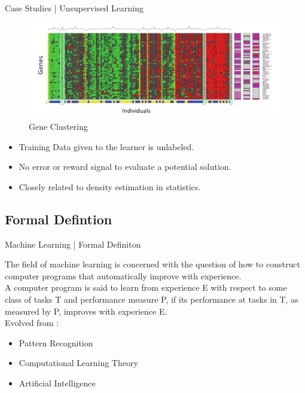 \documentclass[10pt]{beamer}
\begin{document}
			\begin{frame}{Case Studies | Unsupervised Learning}
				\begin{center}
					\begin{figure}
						\centering
						\includegraphics[width=\linewidth]{images/gene-classification}
						\caption[Gene Clustering]{Gene Clustering}
					\end{figure}
					\begin{itemize}
						\item Training Data given to the learner is unlabeled.
						\item No error or reward signal to evaluate a potential solution.
						\item Closely related to density estimation in statistics.
					\end{itemize}
				\end{center}
			\end{frame}
		\subsection{Formal Defintion}
			\begin{frame}{Machine Learning | Formal Definiton}
				\begin{center}
					\small{The field of machine learning is concerned with the question of how to construct computer programs that automatically improve with experience.}\\
					\bigskip
					\large{A computer program is said to learn from experience E with respect to some class of tasks T and performance measure P, if its performance at tasks in T, as measured by P, improves with experience E.}\\
					\bigskip
					\small{Evolved from :}
					\begin{itemize}
						\item {\small Pattern Recognition}
						\item {\small Computational Learning Theory}
						\item {\small Artificial Intelligence}
					\end{itemize}
				\end{center}
			\end{frame}
\end{document}
